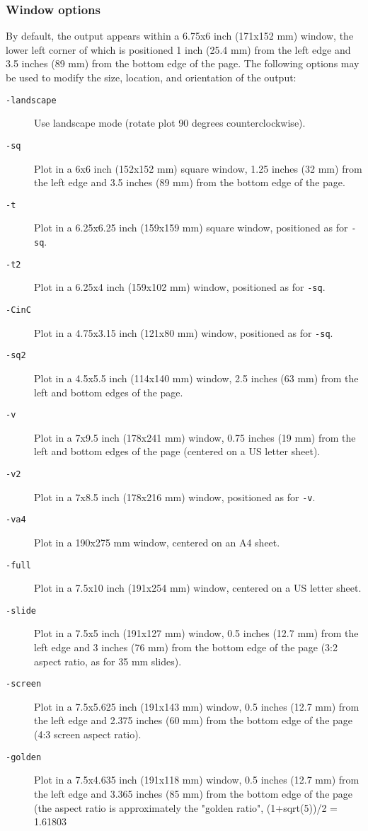 \subsubsection*{Window options}

By default,
the output appears within a 6.75x6 inch (171x152 mm) window, the lower left
corner of which is positioned 1 inch (25.4 mm) from the left edge and 3.5
inches (89 mm) from the bottom edge of the page.  The following options
may be used to modify the size, location, and orientation of the output:
\begin{description}
\item [\texttt{-landscape} ] Use landscape mode (rotate plot 90 degrees counterclockwise).

\item [\texttt{-sq} ] Plot in a 6x6 inch (152x152 mm) square window, 1.25 inches (32 mm) from
the left edge and 3.5 inches (89 mm) from the bottom edge of the page. 
\item [\texttt{-t}
] Plot in a 6.25x6.25 inch (159x159 mm) square window, positioned as for \texttt{-sq}.

\item [\texttt{-t2} ] Plot in a 6.25x4 inch (159x102 mm) window, positioned as for \texttt{-sq}. 
\item [\texttt{-CinC}
] Plot in a 4.75x3.15 inch (121x80 mm) window, positioned as for \texttt{-sq}. 
\item [\texttt{-sq2} ] Plot
in a 4.5x5.5 inch (114x140 mm) window, 2.5 inches (63 mm) from the left and
bottom edges of the page. 
\item [\texttt{-v} ] Plot in a 7x9.5 inch (178x241 mm) window, 0.75
inches (19 mm) from the left and bottom edges of the page (centered on
a US letter sheet). 
\item [\texttt{-v2} ] Plot in a 7x8.5 inch (178x216 mm) window, positioned
as for \texttt{-v}. 
\item [\texttt{-va4} ] Plot in a 190x275 mm window, centered on an A4 sheet. 
\item [\texttt{-full}
] Plot in a 7.5x10 inch (191x254 mm) window, centered on a US letter sheet.

\item [\texttt{-slide} ] Plot in a 7.5x5 inch (191x127 mm) window, 0.5 inches (12.7 mm) from
the left edge and 3 inches (76 mm) from the bottom edge of the page (3:2
aspect ratio, as for 35 mm slides). 
\item [\texttt{-screen} ] Plot in a 7.5x5.625 inch (191x143
mm) window, 0.5 inches (12.7 mm) from the left edge and 2.375 inches (60 mm)
from the bottom edge of the page (4:3 screen aspect ratio). 
\item [\texttt{-golden} ] Plot
in a 7.5x4.635 inch (191x118 mm) window, 0.5 inches (12.7 mm) from the left
edge and 3.365 inches (85 mm) from the bottom edge of the page (the aspect
ratio is approximately the "golden ratio", (1+sqrt(5))/2 = 1.61803  
\end{description}


